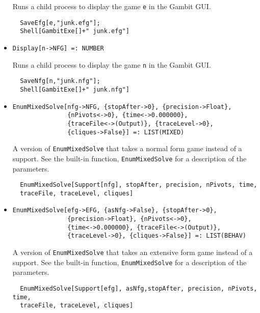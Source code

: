 \begin{itemize}
\bd 
Runs a child process to display the game \verb+e+ in the Gambit GUI. 
\begin{verbatim}
  SaveEfg[e,"junk.efg"];
  Shell[GambitExe[]+" junk.efg"]
\end{verbatim} 
\ed

\item{}
\protect \large \begin{verbatim}
Display[n->NFG] =: NUMBER 
\end{verbatim}\normalsize

\bd 
Runs a child process to display the game \verb+n+ in the Gambit GUI. 
\begin{verbatim}
  SaveNfg[n,"junk.nfg"];
  Shell[GambitExe[]+" junk.nfg"]
\end{verbatim} 
\ed


\item{}
\protect \large \begin{verbatim}
EnumMixedSolve[nfg->NFG, {stopAfter->0}, {precision->Float}, 
               {nPivots<->0}, {time<->0.000000}, 
               {traceFile<->(Output)}, {traceLevel->0}, 
               {cliques->False}] =: LIST(MIXED) 
\end{verbatim}\normalsize

\bd 
A version of \verb+EnumMixedSolve+ that takes a normal form game instead
of a support.  See the built-in function, \verb+EnumMixedSolve+ for a
description of the parameters.
\begin{verbatim}
  EnumMixedSolve[Support[nfg], stopAfter, precision, nPivots, time, 
  traceFile, traceLevel, cliques]
\end{verbatim} 
\ed

\item{}
\protect \large \begin{verbatim}
EnumMixedSolve[efg->EFG, {asNfg->False}, {stopAfter->0}, 
               {precision->Float}, {nPivots<->0}, 
               {time<->0.000000}, {traceFile<->(Output)}, 
               {traceLevel->0}, {cliques->False}] =: LIST(BEHAV) 
\end{verbatim}\normalsize

\bd 
A version of \verb+EnumMixedSolve+ that takes an extensive form game instead
of a support.  See the built-in function, \verb+EnumMixedSolve+ for a
description of the parameters.
\begin{verbatim}
  EnumMixedSolve[Support[efg], asNfg,stopAfter, precision, nPivots, time,
  traceFile, traceLevel, cliques]
\end{verbatim} 
\ed


\end{itemize}
